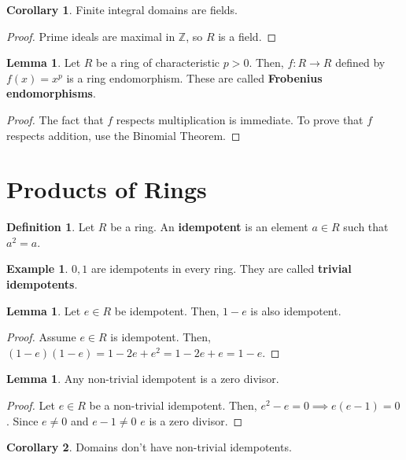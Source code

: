 \documentclass{article}
\theoremstyle{definition}
\newtheorem{definition}{Definition}
\newtheorem{lemma}[theorem]{Lemma}
\newtheorem{corollary}{Corollary}[theorem]
\newtheorem{example}[theorem]{Example}
\newcommand{\Z}{\mathbb{Z}}
\begin{document}
\begin{corollary}
    Finite integral domains are fields.
\end{corollary}
\begin{proof}
    Prime ideals are maximal in $\Z$, so $R$ is a field.
\end{proof}

\begin{lemma}
    Let $R$ be a ring of characteristic $p > 0$. Then, $f: R \xrightarrow{} R$
    defined by $f(x) = x^{p}$ is a ring endomorphism. These are called
    \textbf{Frobenius endomorphisms}.
\end{lemma}
\begin{proof}
    The fact that $f$ respects multiplication is immediate. To prove that $f$
    respects addition, use the Binomial Theorem.
\end{proof}

\newpage

\section{Products of Rings}

\begin{definition}
    Let $R$ be a ring. An \textbf{idempotent} is an element $a \in R$ such that $a^{2} = a$.
\end{definition}

\begin{example}
    $0,1$ are idempotents in every ring. They are called \textbf{trivial idempotents}.
\end{example}

\begin{lemma}
    Let $e \in R$ be idempotent. Then, $1-e$ is also idempotent.
\end{lemma}
\begin{proof}
    Assume $e \in R$ is idempotent. Then, $(1-e)(1-e) = 1 - 2e + e^{2} = 1 - 2e + e = 1 - e$.
\end{proof}

\begin{lemma}
    Any non-trivial idempotent is a zero divisor.
\end{lemma}
\begin{proof}
    Let $e \in R$ be a non-trivial idempotent. Then, $e^{2} - e = 0 \implies e(e - 1) = 0$. Since $e \neq 0$ and $e - 1 \neq 0$
    $e$ is a zero divisor. 
\end{proof}

\begin{corollary}
    Domains don't have non-trivial idempotents.
\end{corollary}
\end{document}
